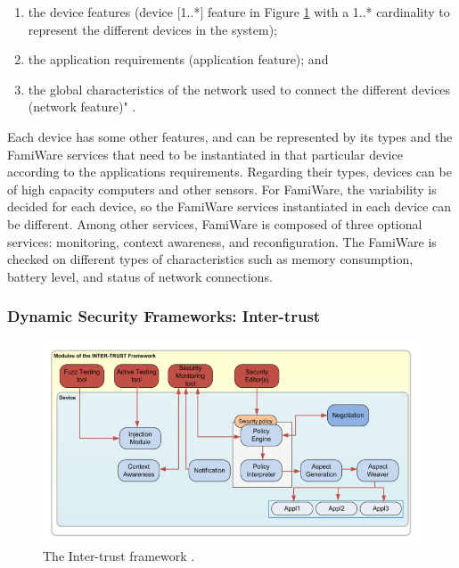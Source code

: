 \documentclass[12pt,a4paper,twoside]{report}
\begin{document}
\begin{enumerate}
	\item  the device features (device [1..*] feature in Figure \ref{fig:02} with a 1..* cardinality to represent the different devices in the system); 
	\item the application requirements (application feature); and 
	\item the global characteristics of the network used to connect the different devices (network feature)" \cite{Pinto;etal:2013}.
\end{enumerate}
Each device has some other features, and can be represented by its types and the FamiWare services that need to be instantiated in that particular device according to the applications requirements. Regarding their types, devices can be of high capacity computers and other sensors. For FamiWare, the variability is decided for each device, so the FamiWare services instantiated in each device can be different. Among other services, FamiWare is composed of three optional services: monitoring, context awareness, and reconfiguration. The FamiWare is checked on different types of characteristics such as memory consumption, battery level, and status of network connections.\par
\subsubsection{Dynamic Security Frameworks: Inter-trust}
\begin{figure}[ht]
	\begin{center}
  \includegraphics[width=1.0\textwidth,natwidth=769,natheight=412]{./figures/figure-02.png}
  \end{center}
  \caption{The Inter-trust framework \cite{ayed;etal:2013}.}
  \label{fig:02}
\end{figure}
\end{document}
